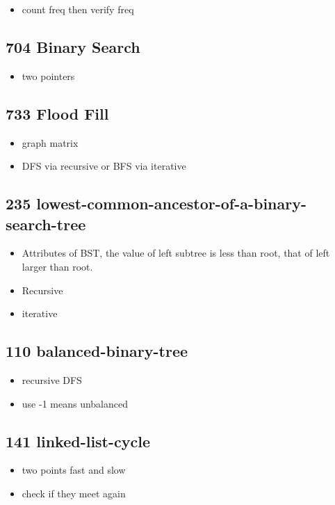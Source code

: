 \begin{itemize}
	\item count freq then verify freq
\end{itemize}

\subsection{704 Binary Search}
\begin{itemize}
	\item two pointers
\end{itemize}

\subsection{733 Flood Fill}

\begin{itemize}
	\item graph matrix
	\item DFS via recursive or BFS via iterative
\end{itemize}

\subsection{235 lowest-common-ancestor-of-a-binary-search-tree}

\begin{itemize}
	\item Attributes of BST, the value of left subtree is less than root, that of left larger than root.
	\item Recursive
	\item iterative
\end{itemize}

\subsection{110 balanced-binary-tree}

\begin{itemize}
	\item recursive DFS
	\item use -1 means unbalanced
\end{itemize}

\subsection{141 linked-list-cycle}

\begin{itemize}
	\item two points fast and slow
	\item check if they meet again

\end{itemize}

